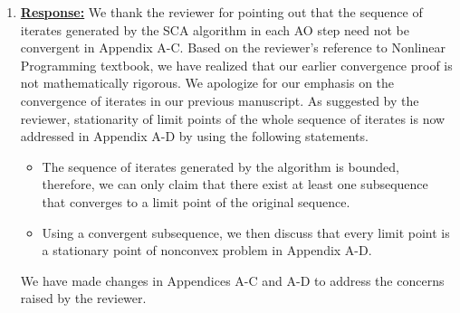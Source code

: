 \begin{enumerate}
	
	\item {}

	\vspace{1eM}
	\underline{\textbf{Response:}} We thank the reviewer for pointing out that the sequence of iterates generated by the \ac{SCA} algorithm in each \ac{AO} step need not be convergent in Appendix A-C. Based on the reviewer's reference to Nonlinear Programming textbook, we have realized that our earlier convergence proof is not mathematically rigorous. We apologize for our emphasis on the convergence of iterates in our previous manuscript. As suggested by the reviewer, stationarity of limit points of the whole sequence of iterates is now addressed in Appendix A-D by using the following statements. 
	\begin{itemize}
		\item The sequence of iterates generated by the algorithm is bounded, therefore, we can only claim that there exist at least one subsequence that converges to a limit point of the original sequence.
		\item Using a convergent subsequence, we then discuss that every limit point is a stationary point of nonconvex problem in Appendix A-D.
	\end{itemize}
	
	We have made changes in Appendices A-C and A-D to address the concerns raised by the reviewer.
				

\end{enumerate}
